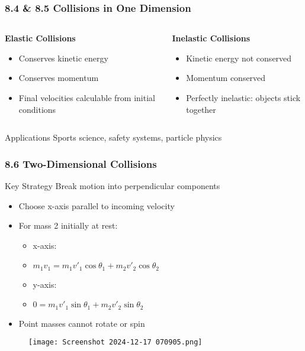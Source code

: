 \documentclass{beamer}
\begin{document}
\begin{frame}
\frametitle{8.4 & 8.5 Collisions in One Dimension}
\begin{columns}[t]
\begin{column}{0.48\textwidth}
\textbf{Elastic Collisions}
\begin{itemize}
\item Conserves kinetic energy
\item Conserves momentum
\item Final velocities calculable from initial conditions
\end{itemize}
\end{column}

\begin{column}{0.48\textwidth}
\textbf{Inelastic Collisions}
\begin{itemize}
\item Kinetic energy not conserved
\item Momentum conserved
\item Perfectly inelastic: objects stick together
\end{itemize}
\end{column}
\end{columns}

\begin{block}{Applications}
Sports science, safety systems, particle physics
\end{block}
\end{frame}

\begin{frame}
\frametitle{8.6 Two-Dimensional Collisions}

\begin{block}{Key Strategy}
Break motion into perpendicular components
\end{block}

\begin{itemize}
\item Choose x-axis parallel to incoming velocity
\item For mass 2 initially at rest:
    \begin{itemize}
    \item x-axis:
    \item $m_1v_1 = m_1v'_1\cos\theta_1 + m_2v'_2\cos\theta_2$
    \item y-axis:
    \item $0 = m_1v'_1\sin\theta_1 + m_2v'_2\sin\theta_2$
    \end{itemize}
\item Point masses cannot rotate or spin
\end{itemize}
\end{frame}
\begin{frame}{}
    \begin{figure}
        \centering
        \texttt{[image: Screenshot 2024-12-17 070905.png]}
       
    \end{figure}
\end{frame}
\end{document}
